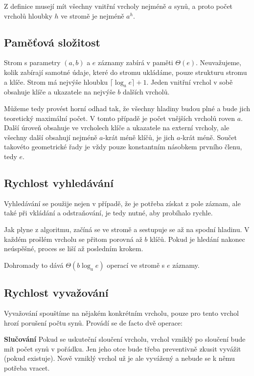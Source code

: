 \documentclass[a4paper,11pt,openany]{article}
\begin{document}
Z definice musejí mít všechny vnitřní vrcholy nejméně $a$ synů, a proto počet vrcholů hloubky $h$ ve stromě je nejméně $a^h$.

\subsection{Paměťová složitost}

Strom s parametry $(a,b)$ a $e$ záznamy zabírá v paměti $\Theta(e)$. Neuvažujeme, kolik zabírají samotné údaje, které do stromu ukládáme, pouze strukturu stromu a klíče. Strom má nejvýše hloubku $\lceil\log_a e\rceil + 1$. Jeden vnitřní vrchol v sobě obsahuje klíče a ukazatele na nejvýše $b$ dalších vrcholů. 

Můžeme tedy provést horní odhad tak, že všechny hladiny budou plné a bude jich teoretický maximální počet. V tomto případě je počet vnějších vrcholů roven $a$. Další úroveň obsahuje ve vrcholech klíče a ukazatele na externí vrcholy, ale všechny další obsahují nejméně $a$-krát méně klíčů, je jich $a$-krát méně. Součet takovéto geometrické řady je vždy pouze konstantním násobkem prvního členu, tedy $e$.

\subsection{Rychlost vyhledávání}

Vyhledávání se použije nejen v případě, že je potřeba získat z pole záznam, ale také při vkládání a odstraňování, je tedy nutné, aby probíhalo rychle. 

Jak plyne z algoritmu, začíná se ve stromě a sestupuje se až na spodní hladinu. V každém prošlém vrcholu se přitom porovná až $b$ klíčů. Pokud je hledání nakonec neúspěšné, proces se liší až posledním krokem.

Dohromady to dává $ \Theta(b\log_a e) $ operací ve stromě s $e$ záznamy.

\subsection{Rychlost vyvažování}

Vyvažování spouštíme na nějakém konkrétním vrcholu, pouze pro tento vrchol hrozí porušení počtu synů. Provádí se de facto dvě operace:

\textbf{Slučování} Pokud se uskuteční sloučení vrcholu, vrchol vzniklý po sloučení bude mít počet synů v pořádku. Jen jeho otce bude třeba preventivně zkusit vyvážit (pokud existuje). Nově vzniklý vrchol už je ale vyvážený a nebude se k němu potřeba vracet.
\end{document}
